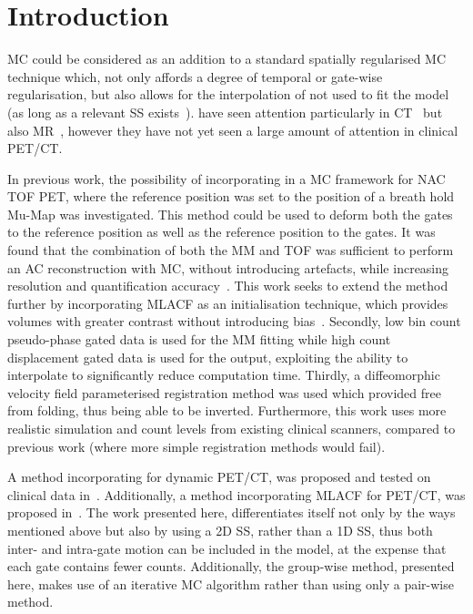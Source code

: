 \section{Introduction} \label{sec:introduction}
     \gls{MC}  could be considered as an addition to a standard spatially regularised \gls{MC} technique which, not only affords a degree of temporal or gate-wise regularisation, but also allows for the interpolation of  not used to fit the model (as long as a relevant \gls{SS} exists~\cite{McClelland2013}).  have seen attention particularly in \gls{CT}~\cite{Li2007EnhancedModel} but also \gls{MR}~\cite{Manke2002RespiratoryModels, Manber2016JointCorrection.}, however they have not yet seen a large amount of attention in clinical \gls{PET}/\gls{CT}.
    
    In previous work, the possibility of incorporating  in a \gls{MC} framework for \gls{NAC} \gls{TOF} \gls{PET}, where the reference position was set to the position of a breath hold \gls{Mu-Map} was investigated. This method could be used to deform both the gates to the reference position as well as the reference position to the gates. It was found that the combination of both the \gls{MM} and \gls{TOF} was sufficient to perform an \gls{AC} reconstruction with \gls{MC}, without introducing artefacts, while increasing resolution and quantification accuracy~\cite{Whitehead2019ImpactPET, Whitehead2020PET/CTFields, Whitehead2021ComparisonMap}. This work seeks to extend the method further by incorporating \gls{MLACF} as an initialisation technique, which provides volumes with greater contrast without introducing bias~\cite{Mizuta2022InitialPET}. Secondly, low bin count pseudo-phase gated data is used for the \gls{MM} fitting while high count displacement gated data is used for the output, exploiting the  ability to interpolate  to significantly reduce computation time. Thirdly, a diffeomorphic velocity field parameterised registration method was used which provided  free from folding, thus being able to be inverted. Furthermore, this work uses more realistic simulation and count levels from existing clinical scanners, compared to previous work (where more simple registration methods would fail).
    
    A method incorporating  for dynamic \gls{PET}/\gls{CT}, was proposed and tested on clinical data in~\cite{Chan2018Non-RigidPET}. Additionally, a method incorporating \gls{MLACF} for \gls{PET}/\gls{CT}, was proposed in~\cite{Lu2018RespiratoryData}. The work presented here, differentiates itself not only by the ways mentioned above but also by using a \gls{2D} \gls{SS}, rather than a \gls{1D} \gls{SS}, thus both inter- and intra-gate motion can be included in the model, at the expense that each gate contains fewer counts. Additionally, the group-wise method, presented here, makes use of an iterative \gls{MC} algorithm rather than using only a pair-wise method.

